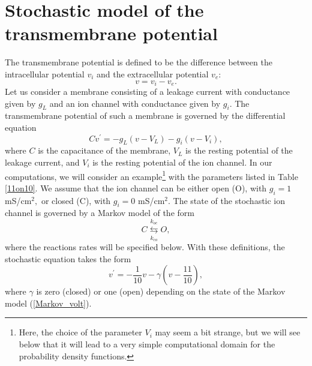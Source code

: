 \section[Stochastic model]{Stochastic model of the transmembrane potential}

The transmembrane potential is defined to be the difference between the
intracellular potential $v_{i}$ and the extracellular potential $v_{e}$:
\begin{equation}
v=v_{i}-v_{e}. \label{v0}
\end{equation}
Let us consider a membrane consisting of a leakage current with conductance
given by $g_{L}$ and an ion channel with conductance given by $g_{i}.$ The
transmembrane potential of such a membrane is governed by the
differential equation
\begin{equation}
Cv^{\prime}=-g_{L}\left(  v-V_{L}\right)  -g_{i}(v-V_{i}), \label{v1}
\end{equation}
where $C$ is the capacitance of the membrane, $V_{L}$ is the resting potential
of the leakage current, and $V_{i}$ is the resting potential of the ion
channel. In our computations, we will consider an example\footnote{Here, the choice of the parameter $V_i$ may seem a bit strange, but we will see below that it will lead to a very simple computational domain for the probability density functions.} 
with the parameters listed in Table \ref{11on10}.
We assume that the ion channel can be either open (O), with $g_{i}=1$ mS/cm$^{2},$ or
closed (C), with $g_{i}=0$ mS/cm$^{2}$. The state of the stochastic ion channel is governed
by a Markov model of the form
\begin{equation}
C\underset{k_{co}}{\overset{k_{oc}}{\leftrightarrows}}O, \label{Markov_volt}
\end{equation}
where the reactions rates will be specified below. With these definitions, the
stochastic equation takes the form
\begin{equation}
v^{\prime}=-\frac{1}{10}v-\gamma\left(  v-\frac{11}{10}\right),  \label{v2}
\end{equation}
where $\gamma$ is zero (closed) or one (open) depending on the state of the Markov model (\ref{Markov_volt}).

